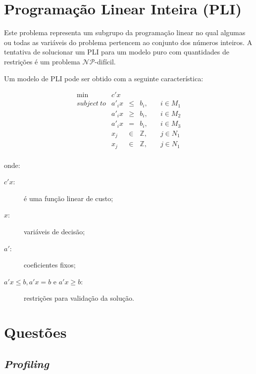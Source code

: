 \section{Programação Linear Inteira (PLI)} \label{sec:pli}
	Este problema representa um subgrupo da programação linear no qual algumas ou todas as variáveis do problema pertencem ao conjunto dos números inteiros. A tentativa de solucionar um PLI para um modelo puro com quantidades de restrições é um problema $\mathcal{NP}$-difícil.

	Um modelo de PLI pode ser obtido com a seguinte característica:

	\begin{equation}
			\begin{array}{rrcll}
			\text{min}  &  c' x    &  ~     &  ~            &  ~               \\
			subject\ to &  a'_i x  &  \leq  &  b_i,         &  \quad i \in M_1 \\
			~           &  a'_i x  &  \geq  &  b_i,         &  \quad i \in M_2 \\
			~           &  a'_i x  &   =    &  b_i,         &  \quad i \in M_3 \\
			~           &  x_j     &  \in   &  \mathbb{Z},  &  \quad j \in N_1 \\
			~           &  x_j     &  \in   &  \mathbb{Z},  &  \quad j \in N_1 \\
			\end{array}
            \label{eq:constraints_pli}
	\end{equation}
    
    onde:
    
    \begin{description}
    	\item [$c'x:$] é uma função linear de custo;
    	\item [$x:$] variáveis de decisão;
    	\item [$a':$] coeficientes fixos;
    	\item [$a'x \leq b, a'x = b$ e $a'x \geq b:$] restrições para validação da solução.
    \end{description}


\section{Questões} 

	\subsection{\textit{Profiling}} \label{sec:dificuldades}

